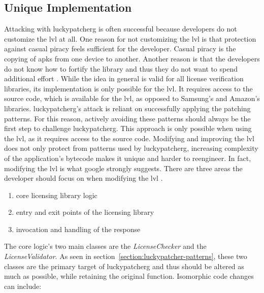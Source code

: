 \subsection{Unique Implementation} \label{subsection:counter-modifications-library}
Attacking with \gls{luckypatcherg} is often successful because developers do not customize the \gls{lvl} at all.
One reason for not customizing the \gls{lvl} is that protection against casual piracy feels sufficient for the developer.
Casual piracy is the copying of \gls{apk}s from one device to another.
\newline
Another reason is that the developers do not know how to fortify the library and thus they do not want to spend additional effort \cite{developersSecuring}.
\newline
While the idea in general is valid for all license verification libraries, its implementation is only possible for the \gls{lvl}.
It requires access to the source code, which is available for the \gls{lvl}, as opposed to Samsung's and Amazon's libraries.
\newline
\gls{luckypatcherg}'s attack is reliant on successfully applying the patching patterns.
For this reason, actively avoiding these patterns should always be the first step to challenge \gls{luckypatcherg}.
\newline
This approach is only possible when using the \gls{lvl}, as it requires access to the source code.
Modifying and improving the \gls{lvl} does not only protect from patterns used by \gls{luckypatcherg}, increasing complexity of the application's bytecode makes it unique and harder to reengineer.
In fact, modifying the lvl is what google strongly suggests. \cite{developersSecuring}
\newline
There are three areas the developer should focus on when modifying the \gls{lvl}  \cite{developersSecuring}.
\begin{enumerate}
\item core licensing library logic
\item entry and exit points of the licensing library
\item invocation and handling of the response
\end{enumerate}
The core logic’s two main classes are the \textit{LicenseChecker} and the \textit{LicenseValidator}.
As seen in section~\ref{section:luckypatcher-patterns}, these two classes are the primary target of \gls{luckypatcherg} and thus should be altered as much as possible, while retaining the original function.
Isomorphic code changes can include:

